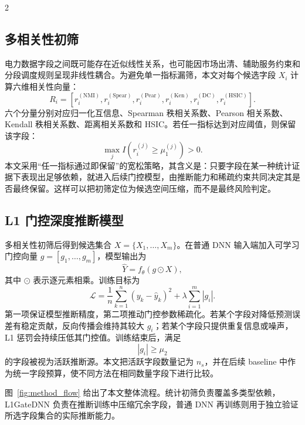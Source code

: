 \documentclass[UTF8,zihao=5,twoside]{ctexart}
\numberwithin{equation}{section}
\newcommand{\metric}[1]{\mathrm{#1}}
\begin{document}
\begin{multicols}{2}
\subsection{多相关性初筛}
电力数据字段之间既可能存在近似线性关系，也可能因市场出清、辅助服务约束和分段调度规则呈现非线性耦合。为避免单一指标漏筛，本文对每个候选字段 $X_i$ 计算六维相关性向量：
\begin{equation}
R_i=[r_i^{(\metric{NMI})},r_i^{(\metric{Spear})},r_i^{(\metric{Pear})},
r_i^{(\metric{Ken})},r_i^{(\metric{DC})},r_i^{(\metric{HSIC})}].
\end{equation}
六个分量分别对应归一化互信息、Spearman 秩相关系数、Pearson 相关系数、Kendall 秩相关系数、距离相关系数和 HSIC。若任一指标达到对应阈值，则保留该字段：
\begin{equation}
\max_j I\left(r_i^{(j)}\geq \mu_1^{(j)}\right)>0.
\end{equation}
本文采用“任一指标通过即保留”的宽松策略，其含义是：只要字段在某一种统计证据下表现出足够依赖，就进入后续门控模型，由推断能力和稀疏约束共同决定其是否最终保留。这样可以把初筛定位为候选空间压缩，而不是最终风险判定。

\subsection{L1 门控深度推断模型}
多相关性初筛后得到候选集合 $X=\{X_1,\ldots,X_m\}$。在普通 DNN 输入端加入可学习门控向量 $g=[g_1,\ldots,g_m]$，模型输出为
\begin{equation}
\hat{Y}=f_{\theta}(g\odot X),
\end{equation}
其中 $\odot$ 表示逐元素相乘。训练目标为
\begin{equation}
\mathcal{L}=\frac{1}{n}\sum_{k=1}^{n}(y_k-\hat{y}_k)^2+\lambda\sum_{i=1}^{m}|g_i|.
\end{equation}
第一项保证模型推断精度，第二项推动门控参数稀疏化。若某个字段对降低预测误差有稳定贡献，反向传播会维持其较大 $g_i$；若某个字段只提供重复信息或噪声，L1 惩罚会持续压低其门控值。训练结束后，满足
\begin{equation}
|g_i|\geq \mu_2
\end{equation}
的字段被视为活跃推断源。本文把活跃字段数量记为 $n_s$，并在后续 baseline 中作为统一字段预算，使不同方法在相同数量字段下进行比较。

图~\ref{fig:method_flow} 给出了本文整体流程。统计初筛负责覆盖多类型依赖，L1GateDNN 负责在推断训练中压缩冗余字段，普通 DNN 再训练则用于独立验证所选字段集合的实际推断能力。


\end{multicols}
\end{document}
